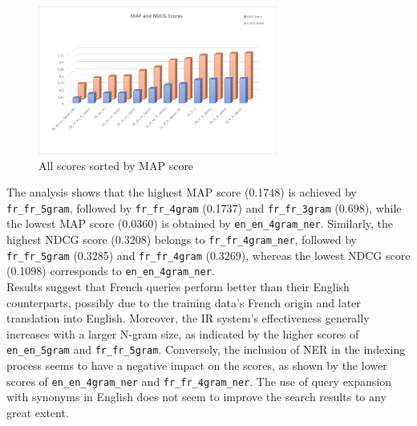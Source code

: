 \begin{figure}[h!]
	\centering
	\includegraphics[width=0.7\textwidth]{figure/allScores.png}
	\caption{All scores sorted by MAP score}
	\label{fig:sorted_scores}
\end{figure}

The analysis shows that the highest MAP score (0.1748) is achieved by \texttt{fr\_fr\_5gram},
followed by \texttt{fr\_fr\_4gram} (0.1737) and \texttt{fr\_fr\_3gram} (0.698), while the lowest MAP score (0.0360) is
obtained by \texttt{en\_en\_4gram\_ner}.
Similarly, the highest NDCG score (0.3208) belongs to \texttt{fr\_fr\_4gram\_ner}, followed by \texttt{fr\_fr\_5gram}
(0.3285) and \texttt{fr\_fr\_4gram} (0.3269), whereas the lowest NDCG score (0.1098) corresponds to
\texttt{en\_en\_4gram\_ner}.\\

Results suggest that French queries perform better than their English counterparts, possibly due to the training data's
French origin and later translation into English.
Moreover, the IR system's effectiveness generally increases with a larger N-gram size, as indicated by the higher scores
of \texttt{en\_en\_5gram} and \texttt{fr\_fr\_5gram}.
Conversely, the inclusion of NER in the indexing process seems to have a negative impact on the scores, as shown by the
lower scores of \texttt{en\_en\_4gram\_ner} and \texttt{fr\_fr\_4gram\_ner}.
The use of query expansion with synonyms in English does not seem to improve the search results to any great extent.\\

